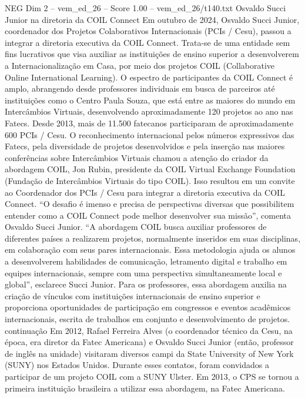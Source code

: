 \begin{textsample}{NEG Dim 2 – vem\_ed\_26 – Score 1.00 – vem\_ed\_26/t140.txt}  \label{ex:f2_neg_037}
Osvaldo Succi Junior na diretoria da COIL Connect Em outubro de 2024, Osvaldo Succi Junior, coordenador dos Projetos Colaborativos Internacionais (PCIs / Cesu), passou a integrar a diretoria executiva da COIL Connect.
Trata-se de uma entidade sem fins lucrativos que visa auxiliar as instituições de ensino superior a desenvolverem a Internacionalização em Casa, por meio dos projetos COIL (Collaborative Online International Learning).
O espectro de participantes da COIL Connect é amplo, abrangendo desde professores individuais em busca de parceiros até instituições como o Centro Paula Souza, que está entre as maiores do mundo em Intercâmbios Virtuais, desenvolvendo aproximadamente 120 projetos ao ano nas Fatecs.
Desde 2013, mais de 11.500 fatecanos participaram de aproximadamente 600 PCIs / Cesu.
O reconhecimento internacional pelos números expressivos das Fatecs, pela diversidade de projetos desenvolvidos e pela inserção nas maiores conferências sobre Intercâmbios Virtuais chamou a atenção do criador da abordagem COIL, Jon Rubin, presidente da COIL Virtual Exchange Foundation (Fundação de Intercâmbios Virtuais do tipo COIL).
Isso resultou em um convite ao Coordenador dos PCIs / Cesu para integrar a diretoria executiva da COIL Connect. “O desafio é imenso e precisa de perspectivas diversas que possibilitem entender como a COIL Connect pode melhor desenvolver sua missão”, comenta Osvaldo Succi Junior. “A abordagem COIL busca auxiliar professores de diferentes países a realizarem projetos, normalmente inseridos em suas disciplinas, em colaboração com seus pares internacionais.
Essa metodologia ajuda os alunos a desenvolverem habilidades de comunicação, letramento digital e trabalho em equipes internacionais, sempre com uma perspectiva simultaneamente local e global”, esclarece Succi Junior.
Para os professores, essa abordagem auxilia na criação de vínculos com instituições internacionais de ensino superior e proporciona oportunidades de participação em congressos e eventos acadêmicos internacionais, escrita de trabalhos em conjunto e desenvolvimento de projetos. continuação Em 2012, Rafael Ferreira Alves (o coordenador técnico da Cesu, na época, era diretor da Fatec Americana) e Osvaldo Succi Junior (então, professor de inglês na unidade) visitaram diversos campi da State University of New York (SUNY) nos Estados Unidos.
Durante esses contatos, foram convidados a participar de um projeto COIL com a SUNY Ulster.
Em 2013, o CPS se tornou a primeira instituição brasileira a utilizar essa abordagem, na Fatec Americana.

\end{textsample}
